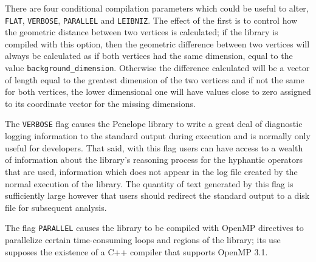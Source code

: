 \documentclass[12pt,letterpaper]{report}
\begin{document}
There are four conditional compilation parameters which could be useful to alter, 
\texttt{FLAT}, \texttt{VERBOSE}, \texttt{PARALLEL} and \texttt{LEIBNIZ}. The effect of the 
first is to control how the geometric distance between two vertices is calculated; 
if the library is compiled with this option, then the geometric difference between 
two vertices will always be calculated as if both vertices had the same dimension, 
equal to the value \texttt{background\_dimension}. Otherwise the difference calculated 
will be a vector of length equal to the greatest dimension of the two vertices and 
if not the same for both vertices, the lower dimensional one will have values close 
to zero assigned to its coordinate vector for the missing dimensions. 

The \texttt{VERBOSE} flag causes the Penelope library to write a great deal of 
diagnostic logging information to the standard output during execution and is normally 
only useful for developers. That said, with this flag users can have access to a 
wealth of information about the library's reasoning process for the hyphantic operators 
that are used, information which does not appear in the log file created by the normal 
execution of the library. The quantity of text generated by this flag is sufficiently 
large however that users should redirect the standard output to a disk file for subsequent 
analysis. 

The flag \texttt{PARALLEL} causes the library to be compiled with OpenMP directives to 
parallelize certain time-consuming loops and regions of the library; its use supposes the 
existence of a C++ compiler that supports OpenMP 3.1. 
\end{document}
